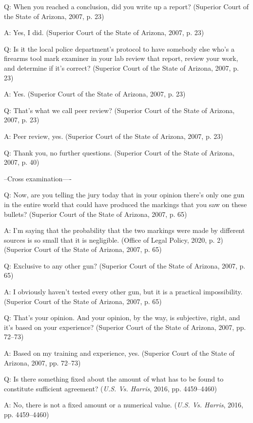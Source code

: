 \documentclass[print]{nuthesis}
\begin{document}
Q: When you reached a conclusion, did you write up a report? (Superior Court of the State of Arizona, 2007, p. 23)

A: Yes, I did. (Superior Court of the State of Arizona, 2007, p. 23)

Q: Is it the local police department's protocol to have somebody else who's a firearms tool mark examiner in your lab review that report, review your work, and determine if it's correct? (Superior Court of the State of Arizona, 2007, p. 23)

A: Yes. (Superior Court of the State of Arizona, 2007, p. 23)

Q: That's what we call peer review? (Superior Court of the State of Arizona, 2007, p. 23)

A: Peer review, yes. (Superior Court of the State of Arizona, 2007, p. 23)

Q: Thank you, no further questions. (Superior Court of the State of Arizona, 2007, p. 40)

--Cross examination----

Q: Now, are you telling the jury today that in your opinion there's only one gun in the entire world that could have produced the markings that you saw on these bullets? (Superior Court of the State of Arizona, 2007, p. 65)

A: I'm saying that the probability that the two markings were made by different sources is so small that it is negligible. (Office of Legal Policy, 2020, p. 2) (Superior Court of the State of Arizona, 2007, p. 65)

Q: Exclusive to any other gun? (Superior Court of the State of Arizona, 2007, p. 65)

A: I obviously haven't tested every other gun, but it is a practical impossibility. (Superior Court of the State of Arizona, 2007, p. 65)

Q: That's your opinion. And your opinion, by the way, is subjective, right, and it's based on your experience? (Superior Court of the State of Arizona, 2007, pp. 72--73)

A: Based on my training and experience, yes. (Superior Court of the State of Arizona, 2007, pp. 72--73)

Q: Is there something fixed about the amount of what has to be found to constitute sufficient agreement? (\emph{{U.S.} Vs. {Harris}}, 2016, pp. 4459--4460)

A: No, there is not a fixed amount or a numerical value. (\emph{{U.S.} Vs. {Harris}}, 2016, pp. 4459--4460)
\end{document}
